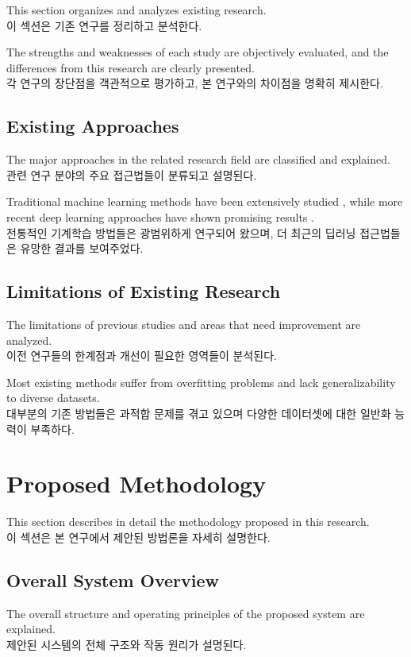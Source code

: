 \documentclass[12pt,a4paper]{article}
\begin{document}
This section organizes and analyzes existing research. \\
이 섹션은 기존 연구를 정리하고 분석한다.

The strengths and weaknesses of each study are objectively evaluated, and the differences from this research are clearly presented. \\
각 연구의 장단점을 객관적으로 평가하고, 본 연구와의 차이점을 명확히 제시한다.

\subsection{Existing Approaches}
The major approaches in the related research field are classified and explained. \\
관련 연구 분야의 주요 접근법들이 분류되고 설명된다.

Traditional machine learning methods have been extensively studied \cite{hastie2009elements}, while more recent deep learning approaches have shown promising results \cite{schmidhuber2015deep}. \\
전통적인 기계학습 방법들은 광범위하게 연구되어 왔으며, 더 최근의 딥러닝 접근법들은 유망한 결과를 보여주었다.

\subsection{Limitations of Existing Research}
The limitations of previous studies and areas that need improvement are analyzed. \\
이전 연구들의 한계점과 개선이 필요한 영역들이 분석된다.

Most existing methods suffer from overfitting problems and lack generalizability to diverse datasets. \\
대부분의 기존 방법들은 과적합 문제를 겪고 있으며 다양한 데이터셋에 대한 일반화 능력이 부족하다.

\section{Proposed Methodology}
\label{sec:methodology}

This section describes in detail the methodology proposed in this research. \\
이 섹션은 본 연구에서 제안된 방법론을 자세히 설명한다.

\subsection{Overall System Overview}
The overall structure and operating principles of the proposed system are explained. \\
제안된 시스템의 전체 구조와 작동 원리가 설명된다.
\end{document}
